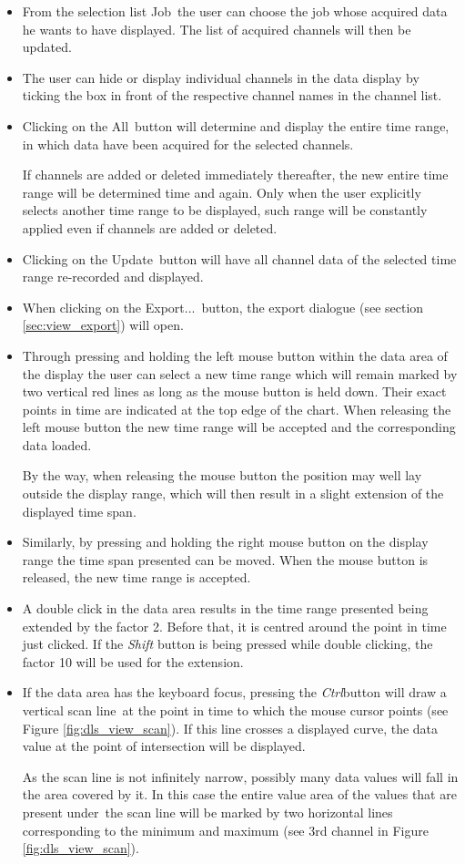\documentclass[a4paper,12pt,BCOR6mm,bibtotoc,idxtotoc]{scrbook}
\begin{document}
\begin{itemize} 
\item From the selection list \glqq Job\grqq\ the user can choose the job whose acquired data he wants to have displayed. The list of acquired channels will then be updated. 
\item The user can hide or display individual channels in the data display by ticking the box in front of the respective channel names in the channel list. 
\item Clicking on the \glqq All\grqq\ button will determine and display the entire time range, in which data have been acquired for the selected channels.

If channels are added or deleted immediately thereafter, the new entire time range will be determined time and again. Only when the user explicitly selects another time range to be displayed, such range will be constantly applied even if channels are added or deleted. 
\item Clicking on the \glqq Update\grqq\ button will have all channel data of the selected time range re-recorded and displayed. 
\item When clicking on the \glqq Export...\grqq\ button, the export dialogue (see section \ref{sec:view_export}) will open. 
\item Through pressing and holding the left mouse button within the data area of the display the user can select a new time range which will remain marked by two vertical red lines as long as the mouse button is held down. Their exact points in time are indicated at the top edge of the chart. When releasing the left mouse button the new time range will be accepted and the corresponding data loaded.

By the way, when releasing the mouse button the position may well lay outside the display range, which will then result in a slight extension of the displayed time span. 
\item Similarly, by pressing and holding the right mouse button on the display range the time span presented can be moved. When the mouse button is released, the new time range is accepted. 
\item A double click in the data area results in the time range presented being extended by the factor 2. Before that, it is centred around the point in time just clicked. If the \textit{Shift} button is being pressed while double clicking, the factor 10 will be used for the extension. 
\item If the data area has the keyboard focus, pressing the \textit{Ctrl}button will draw a vertical \glqq scan line\grqq\ at the point in time to which the mouse cursor points (see Figure \ref{fig:dls_view_scan}). If this line crosses a displayed curve, the data value at the point of intersection will be displayed.

As the scan line is not infinitely narrow, possibly many data values will fall in the area covered by it. In this case the entire value area of the values that are present \glqq under\grqq\  the scan line will be marked by two horizontal lines corresponding to the minimum and maximum (see 3rd channel in Figure \ref{fig:dls_view_scan}). \end{itemize}
\end{document}
